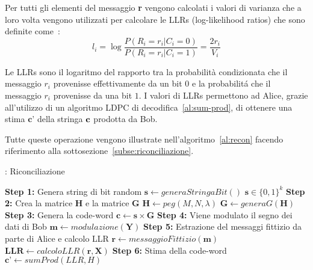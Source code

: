 Per tutti gli elementi del messaggio \textbf{r} vengono calcolati i valori di varianza che a loro volta vengono utilizzati per calcolare le LLRs (log-likelihood ratios) che sono definite come~\cite{gumucs2021novel}:
\begin{equation}
l_i = \log \frac{P(R_i = r_i| C_i = 0)}{P(R_i = r_i| C_i = 1)} = \frac{2r_i}{V_i}
\end{equation}

Le LLRs sono il logaritmo del rapporto tra la probabilit\`a condizionata che il messaggio $r_i$ provenisse effettivamente da un bit $0$ e la probabilit\'a che il messaggio $r_i$ provenisse da una bit $1$. I valori di LLRs permettono ad Alice, grazie all'utilizzo di un algoritmo LDPC di decodifica~\ref{al:sum-prod}, di ottenere una stima $\textbf{c'}$ della stringa $\textbf c$ prodotta da Bob.



Tutte queste operazione vengono illustrate nell'algoritmo~\ref{al:recon} facendo riferimento alla sottosezione~\ref{subse:riconciliazione}.

\begin{algorithm}[H]
\caption{: Riconciliazione}\label{al:recon}
\begin{algorithmic}[1]
\State \textbf{Step 1:} Genera string di bit random
	\State $\textbf{s} \leftarrow generaStringaBit()$	\Comment $\textbf{s} \in \{0,1\}^k$
\State \textbf{Step 2:} Crea la matrice $\textbf{H}$ e la matrice $\textbf{G}$
	\State $\textbf{H} \leftarrow peg(M,N, \lambda )$	 
	\State {}							
	\State $ \textbf{G} \leftarrow generaG(\textbf{H})$
\State \textbf{Step 3:} Genera la code-word
	\State $\textbf{c} \leftarrow \textbf{s} \times \textbf{G}$
\State \textbf{Step 4:} Viene modulato il segno dei dati di Bob
	\State $\textbf{m} \leftarrow modulazione(\textbf{Y})$
\State \textbf{Step 5:} Estrazione del messaggi fittizio da parte di Alice e calcolo LLR
	\State $\textbf{r} \leftarrow messaggioFittizio(\textbf{m})$
	\State $\textbf{LLR} \leftarrow calcoloLLR(\textbf{r}, \textbf{X})$
\State \textbf{Step 6:} Stima della code-word
	\State $\textbf{c'} \leftarrow sumProd(LLR, H)$
\end{algorithmic}
\end{algorithm}


